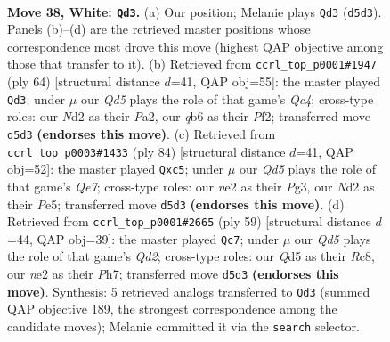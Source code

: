 \documentclass[11pt]{article}
\begin{document}
\clearpage

\begin{figure}[p]\centering
\begin{subfigure}{0.46\textwidth}\centering
\resizebox{\linewidth}{!}{%
\newchessgame
\chessboard[
  setfen={2r3k1/1p3p2/1q4p1/p2Q4/7p/7P/P2NnPP1/b6K w - - 3 38},
  showmover=false,
  pgfstyle=straightmove, color=movearrow, markmove={d5-d3}
]}
\caption{}
\end{subfigure}\hfill
\begin{subfigure}{0.46\textwidth}\centering
\resizebox{\linewidth}{!}{%
\newchessgame
\chessboard[
  setfen={6k1/p2b1p1p/1p6/6q1/2QNP2p/2P5/P4PP1/6K1 w - - 0 33},
  showmover=false,
  pgfstyle=straightmove, color=movearrow, markmove={c4-d3}
]}
\caption{}
\end{subfigure}
\\[4pt]
\begin{subfigure}{0.46\textwidth}\centering
\resizebox{\linewidth}{!}{%
\newchessgame
\chessboard[
  setfen={8/4Qp1k/6p1/2p1P2p/p6P/6P1/qP3P1K/8 w - - 8 43},
  showmover=false,
  pgfstyle=straightmove, color=movearrow, markmove={e7-c5}
]}
\caption{}
\end{subfigure}\hfill
\begin{subfigure}{0.46\textwidth}\centering
\resizebox{\linewidth}{!}{%
\newchessgame
\chessboard[
  setfen={2r4k/1p1q2pp/p6n/2P5/P1QN4/8/6PP/5R1K b - - 0 30},
  showmover=false,
  pgfstyle=straightmove, color=movearrow, markmove={d7-c7}
]}
\caption{}
\end{subfigure}
\caption{\textbf{Move 38, White: \texttt{Qd3}.} (a) Our position; Melanie plays \texttt{Qd3} (\texttt{d5d3}). Panels (b)--(d) are the retrieved master positions whose correspondence most drove this move (highest QAP objective among those that transfer to it). (b) Retrieved from \texttt{ccrl\_top\_p0001\#1947} (ply 64) [structural distance $d$=41, QAP obj=55]: the master played \texttt{Qd3}; under $\mu$ our \emph{Qd5} plays the role of that game's \emph{Qc4}; cross-type roles: our \emph{N}d2 as their \emph{P}a2, our \emph{q}b6 as their \emph{P}f2; transferred move \texttt{d5d3} \textbf{(endorses this move)}. (c) Retrieved from \texttt{ccrl\_top\_p0003\#1433} (ply 84) [structural distance $d$=41, QAP obj=52]: the master played \texttt{Qxc5}; under $\mu$ our \emph{Qd5} plays the role of that game's \emph{Qe7}; cross-type roles: our \emph{n}e2 as their \emph{P}g3, our \emph{N}d2 as their \emph{P}e5; transferred move \texttt{d5d3} \textbf{(endorses this move)}. (d) Retrieved from \texttt{ccrl\_top\_p0001\#2665} (ply 59) [structural distance $d$=44, QAP obj=39]: the master played \texttt{Qc7}; under $\mu$ our \emph{Qd5} plays the role of that game's \emph{Qd2}; cross-type roles: our \emph{Q}d5 as their \emph{R}c8, our \emph{n}e2 as their \emph{P}h7; transferred move \texttt{d5d3} \textbf{(endorses this move)}. Synthesis: 5 retrieved analogs transferred to \texttt{Qd3} (summed QAP objective 189, the strongest correspondence among the candidate moves); Melanie committed it via the \texttt{search} selector.}
\label{fig:thought-m74}
\end{figure}
\end{document}
